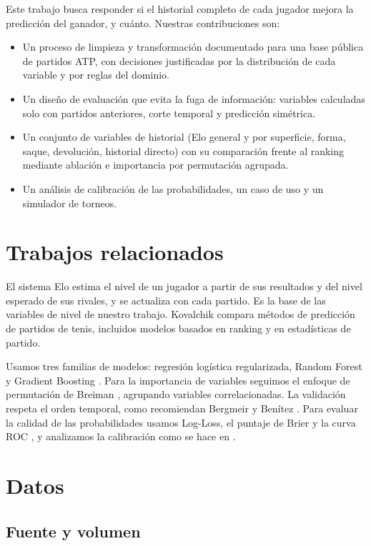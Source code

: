 \documentclass[11pt,a4paper]{article}
\begin{document}
Este trabajo busca responder si el historial completo de cada jugador mejora la predicción del ganador, y cuánto. Nuestras contribuciones son:
\begin{itemize}
  \item Un proceso de limpieza y transformación documentado para una base pública de partidos ATP, con decisiones justificadas por la distribución de cada variable y por reglas del dominio.
  \item Un diseño de evaluación que evita la fuga de información: variables calculadas solo con partidos anteriores, corte temporal y predicción simétrica.
  \item Un conjunto de variables de historial (Elo general y por superficie, forma, saque, devolución, historial directo) con su comparación frente al ranking mediante ablación e importancia por permutación agrupada.
  \item Un análisis de calibración de las probabilidades, un caso de uso y un simulador de torneos.
\end{itemize}

\section{Trabajos relacionados}

El sistema Elo \cite{elo1978} estima el nivel de un jugador a partir de sus resultados y del nivel esperado de sus rivales, y se actualiza con cada partido. Es la base de las variables de nivel de nuestro trabajo. Kovalchik \cite{kovalchik2016} compara métodos de predicción de partidos de tenis, incluidos modelos basados en ranking y en estadísticas de partido.

Usamos tres familias de modelos: regresión logística regularizada, Random Forest \cite{breiman2001} y Gradient Boosting \cite{friedman2001}. Para la importancia de variables seguimos el enfoque de permutación de Breiman \cite{breiman2001}, agrupando variables correlacionadas. La validación respeta el orden temporal, como recomiendan Bergmeir y Benítez \cite{bergmeir2012}. Para evaluar la calidad de las probabilidades usamos Log-Loss, el puntaje de Brier \cite{brier1950} y la curva ROC \cite{fawcett2006}, y analizamos la calibración como se hace en \cite{guo2017}.

\section{Datos}

\subsection{Fuente y volumen}
\end{document}
